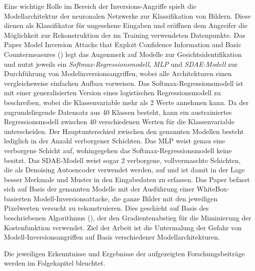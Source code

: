 Eine wichtige Rolle im Bereich der Inversions-Angriffe spielt die Modellarchitektur der neuronalen Netzwerke zur Klassifikation von Bildern. Diese dienen als Klassifikator für ungesehene Eingaben und eröffnen dem Angreifer die Möglichkeit zur Rekonstruktion der im Training verwendeten Datenpunkte. Das Paper \glqq Model Inversion Attacks that Exploit Confidence Information and Basic Countermeasures\grqq{} (\cite[7]{fredrikson_model_2015}) legt das Augenmerk auf Modelle zur Gesichtsidentifikation und nutzt jeweils ein \textit{Softmax-Regressionsmodell}, \textit{MLP} und \textit{SDAE-Modell} zur Durchführung von Modelinversionsangriffen, wobei alle Architekturen einen vergleichsweise einfachen Aufbau vorweisen. Das Softmax-Regressionsmodell ist mit einer generalisierten Version eines logistischen Regressionsmodell zu beschreiben, wobei die Klassenvariable mehr als 2 Werte annehmen kann. Da der zugrundeliegende Datensatz aus 40 Klassen besteht, kann ein austrainiertes Regressionsmodell zwischen 40 verschiedenen Werten für die Klassenvariable unterscheiden. Der Hauptunterschied zwischen den genannten Modellen  besteht lediglich in der Anzahl verborgener Schichten. Das MLP weist genau eine verborgene Schicht auf, wohingegehen das Softmax-Regressionsmodell keine besitzt. Das SDAE-Modell weist sogar 2 verborgene, vollvermaschte Schichten, die als \glqq Denoising Autoencoder\grqq{} verwendet werden, auf und ist damit in der Lage besser Merkmale und Muster in den Eingabedaten zu erfassen. Das Paper befasst sich auf Basis der genannten Modelle mit der Ausführung einer WhiteBox-basierten Modell-Inversionsattacke, die ganze Bilder mit den jeweiligen Pixelwerten versucht zu rekonstruieren. Dies geschieht auf Basis des beschriebenen Algorithmus (\cite[8]{fredrikson_model_2015}), der den Gradientenabstieg für die Miminierung der Kostenfunktion verwendet. Ziel der Arbeit ist die Untermalung der Gefahr von Modell-Inversionsangriffen auf Basis verschiedener Modellarchitekturen.

Die jeweiligen Erkenntnisse und Ergebnisse der aufgezeigten Forschungsbeiträge werden im Folgekapitel bleuchtet.
